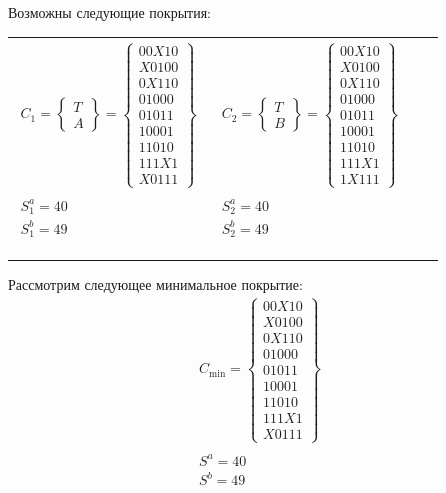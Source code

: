 \documentclass{article}
\begin{document}
Возможны следующие покрытия:
\begin{center}\begin{tabular}{cccc}
$\begin{array}{c}
C_{1} = \begin{Bmatrix} T\\ A\end{Bmatrix} = \begin{Bmatrix}00X10\\X0100\\0X110\\01000\\01011\\10001\\11010\\111X1\\ X0111\end{Bmatrix} \\ \\
S^a_{1} = 40 \\
S^b_{1} = 49 \\ \phantom{0}
\end{array}$
 & $\begin{array}{c}
C_{2} = \begin{Bmatrix} T\\ B\end{Bmatrix} = \begin{Bmatrix}00X10\\X0100\\0X110\\01000\\01011\\10001\\11010\\111X1\\ 1X111\end{Bmatrix} \\ \\
S^a_{2} = 40 \\
S^b_{2} = 49 \\ \phantom{0}
\end{array}$
\\
\end{tabular}\end{center}

Рассмотрим следующее минимальное покрытие:
\[\begin{array}{c}
C_{\text{min}} = \begin{Bmatrix}00X10\\X0100\\0X110\\01000\\01011\\10001\\11010\\111X1\\X0111\end{Bmatrix} \\ \\
S^a = 40 \\
S^b = 49
\end{array}\]
\end{document}
